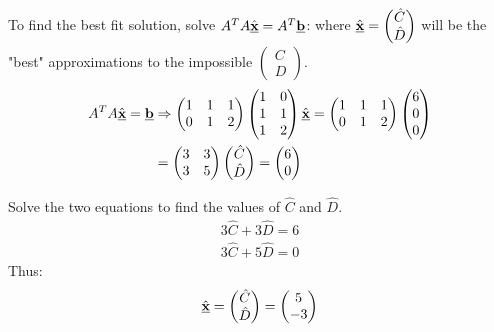 \documentclass[10pt,a4paper]{article}
\begin{document}
To ﬁnd the best ﬁt solution, solve $A^T A \hat{\textbf{\underline{x}}} = A^T
\textbf{\underline{b}}$: where $\hat{\textbf{\underline{x}}} =
\begin{pmatrix}\hat{C}\\\hat{D}\end{pmatrix}$ will be the "best" approximations to the impossible
$\begin{pmatrix}C\\D\end{pmatrix}$.
\begin{align*}
    A^T A \hat{\textbf{\underline{x}}} = \textbf{\underline{b}} &\Rightarrow \begin{pmatrix} 
        1&1&1\\
        0&1&2
    \end{pmatrix}\begin{pmatrix}
        1&0\\1&1\\1&2
    \end{pmatrix}\hat{\textbf{\underline{x}}} = \begin{pmatrix} 
        1&1&1\\
        0&1&2
    \end{pmatrix}\begin{pmatrix}
        6\\0\\0
    \end{pmatrix}  \\
    &= \begin{pmatrix}
        3&3 \\ 3&5
    \end{pmatrix}\begin{pmatrix}
        \hat{C} \\
        \hat{D}
    \end{pmatrix} = \begin{pmatrix}
        6\\0
    \end{pmatrix}
\end{align*}

Solve the two equations to find the values of $\hat{C}$ and $\hat{D}$.
\begin{align*}
    3\hat{C} + 3\hat{D} = 6 \\
    3\hat{C} + 5\hat{D} = 0 
\end{align*}
Thus:
\begin{align*}
    \hat{\textbf{\underline{x}}} = \begin{pmatrix}
        \hat{C} \\ \hat{D}
    \end{pmatrix} = \begin{pmatrix}
        5 \\ -3
    \end{pmatrix}
\end{align*}
\end{document}
